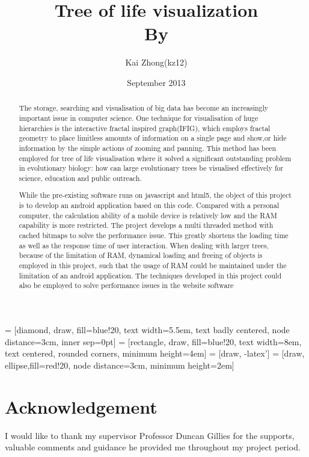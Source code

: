 \documentclass[MSc]{icldt}
\title{Tree of life visualization \\ By}
\author{Kai Zhong(kz12)}
\date{September 2013}
\begin{document}
\maketitle

 = [diamond, draw, fill=blue!20, 
    text width=5.5em, text badly centered, node distance=3cm, inner sep=0pt]
 = [rectangle, draw, fill=blue!20, 
    text width=8em, text centered, rounded corners, minimum height=4em]
 = [draw, -latex']
 = [draw, ellipse,fill=red!20, node distance=3cm,
    minimum height=2em]
    
\begin{abstract}

The storage, searching and visualisation of big data has become an increasingly important issue in computer science. One technique for visualisation of huge hierarchies is the interactive fractal inspired graph(IFIG), which employs fractal geometry to place limitless amounts of information on a single page and show,or  hide information by the simple actions of zooming and panning. This method has been employed for tree of life visualisation where it solved a significant outstanding problem in evolutionary biology: how can large evolutionary trees be visualised effectively for science, education and public outreach.

While the pre-existing software runs on javascript and html5, the object of this project is to develop an android application based on this code. Compared with a personal computer, the calculation ability of a mobile device is relatively low and the RAM capability is more restricted. The project develops a multi threaded method with cached bitmaps to solve the performance issue. This greatly shortens the loading time as well as the response time of user interaction. When dealing with larger trees, because of the limitation of RAM, dynamical loading and freeing of objects is employed in this project, such that the usage of RAM could be maintained under the limitation of an android application. 
The techniques developed in this project could also be employed to solve performance issues in the website software

\end{abstract}

\chapter*{Acknowledgement}

I would like to thank my supervisor Professor Duncan Gillies for the supports, valuable comments and guidance he provided me throughout my project period.
\end{document}
